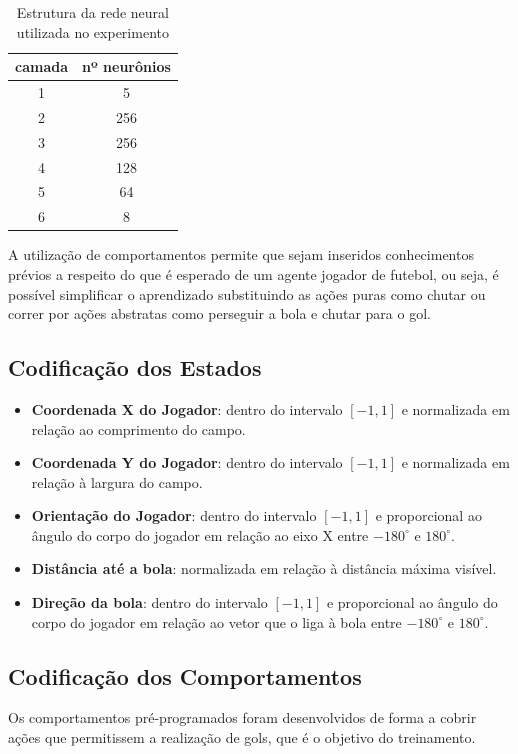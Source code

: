 \begin{table}[h]
	\centering
	\begin{tabular}{||c c||} 
		\hline
		camada & nº neurônios  \\ [0.5ex] 
		\hline\hline
		1 & 5  \\ 
		\hline
		2 &  256 \\
		\hline
		3 & 256 \\
		\hline
		4 & 128  \\
		\hline
		5 & 64 \\ 
		\hline
		6 & 8 \\ [1ex] 
		\hline
	\end{tabular}
	\caption{Estrutura da rede neural utilizada no experimento}
	\label{table:ann}
\end{table}

A utilização de comportamentos permite que sejam inseridos conhecimentos prévios a respeito do que é esperado de um agente jogador de futebol, ou seja, é possível simplificar o aprendizado substituindo as ações puras como chutar ou correr por ações abstratas como perseguir a bola e chutar para o gol.

\subsection{Codificação dos Estados}
\label{subsubsec:state-approx}
\begin{itemize}
	\item \textbf{Coordenada X do Jogador}: dentro do intervalo $[-1, 1]$ e normalizada em relação ao comprimento do campo.
	\item \textbf{Coordenada Y do Jogador}: dentro do intervalo $[-1, 1]$ e normalizada em relação à largura do campo.
	\item \textbf{Orientação do Jogador}: dentro do intervalo $[-1, 1]$ e proporcional ao ângulo do corpo do jogador em relação ao eixo X entre $-180^{\circ}$ e $180^{\circ}$.
	\item \textbf{Distância até a bola}: normalizada em relação à distância máxima visível.
	\item \textbf{Direção da bola}: dentro do intervalo $[-1, 1]$ e proporcional ao ângulo do corpo do jogador em relação ao vetor que o liga à bola entre $-180^{\circ}$ e $180^{\circ}$. 
	
\end{itemize}

\subsection{Codificação dos Comportamentos}
\label{subsubsec:behaviors-mapping}
Os comportamentos pré-programados foram desenvolvidos de forma a cobrir ações que permitissem a realização de gols, que é o objetivo do treinamento.

